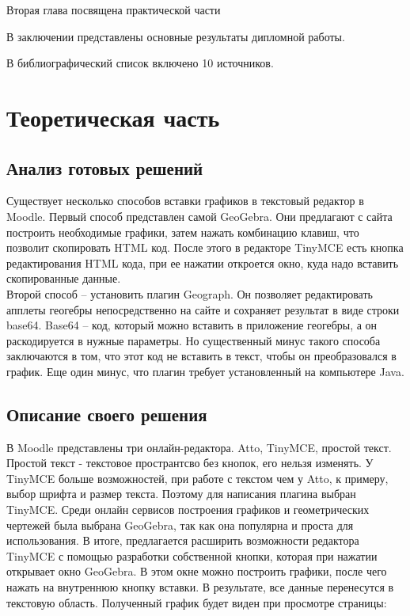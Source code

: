 \documentclass[14pt,Diplom]{diplomwork}
\begin{document}
Вторая глава посвящена практической части


В заключении представлены основные результаты дипломной работы.

В библиографический список включено 10 источников.



\chapter{Теоретическая часть}

\section{Анализ готовых решений}

Существует несколько способов вставки графиков в текстовый редактор в Moodle. Первый способ представлен самой GeoGebra. Они предлагают с сайта построить необходимые графики, затем нажать комбинацию клавиш, что позволит скопировать HTML код. После этого в редакторе TinyMCE есть кнопка редактирования HTML кода, при ее нажатии откроется окно, куда надо вставить скопированные данные.\\
Второй способ – установить плагин Geograph. Он позволяет редактировать апплеты геогебры непосредственно на сайте и сохраняет результат в виде строки base64. Base64 – код, который можно вставить в приложение геогебры, а он раскодируется в нужные параметры. Но существенный минус такого способа заключаются в том, что этот код не вставить в текст, чтобы он преобразовался в график. Еще один минус, что плагин требует установленный на компьютере Java.

\section{Описание своего решения}

В Moodle представлены три онлайн-редактора. Atto, TinyMCE, простой текст. Простой текст - текстовое пространтсво без кнопок, его нельзя изменять. У TinyMCE больше возможностей, при работе с текстом чем у Atto, к примеру, выбор шрифта и размер текста. Поэтому для написания плагина выбран TinyMCE. Среди онлайн сервисов построения графиков и геометрических чертежей была выбрана GeoGebra, так как она популярна и проста для использования. В итоге, предлагается расширить возможности редактора TinyMCE с помощью разработки собственной кнопки, которая при нажатии открывает окно GeoGebra. В этом окне можно построить графики, после чего нажать на внутреннюю кнопку вставки. В результате, все данные перенесутся в текстовую область. Полученный график будет виден при просмотре страницы:
\end{document}
